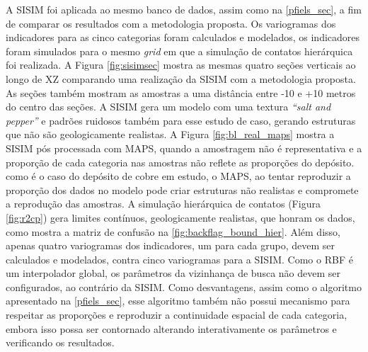 A SISIM foi aplicada ao mesmo banco de dados, assim como na \autoref{pfiels_sec}, a fim de comparar os resultados com a metodologia proposta. Os variogramas dos indicadores para as cinco categorias foram calculados e modelados, os indicadores foram simulados para o mesmo \textit{grid} em que a simulação de contatos hierárquica foi realizada. A Figura \autoref{fig:sisimsec} mostra as mesmas quatro seções verticais ao longo de XZ comparando uma realização da SISIM com a metodologia proposta. As seções também mostram as amostras a uma distância entre -10 e +10 metros do centro das seções. A SISIM gera um modelo com uma textura \textit{“salt and pepper”} e padrões ruidosos também para esse estudo de caso, gerando estruturas que não são geologicamente realistas. A Figura \autoref{fig:bl_real_maps} mostra a SISIM pós processada com MAPS, quando a amostragem não é representativa e a proporção de cada categoria nas amostras não reflete as proporções do depósito. como é o caso do depósito de cobre em estudo, o MAPS, ao tentar reproduzir a proporção dos dados no modelo pode criar estruturas não realistas e compromete a reprodução das amostras. A simulação hierárquica de contatos (Figura \autoref{fig:r2cp}) gera limites contínuos, geologicamente realistas, que honram os dados, como mostra a matriz de confusão na \autoref{fig:backflag_bound_hier}. Além disso, apenas quatro variogramas dos indicadores, um para cada grupo, devem ser calculados e modelados, contra cinco variogramas para a SISIM. Como o RBF é um interpolador global, os parâmetros da vizinhança de busca não devem ser configurados, ao contrário da SISIM. Como desvantagens, assim como o algoritmo apresentado na \autoref{pfiels_sec}, esse algoritmo também não possui mecanismo para respeitar as proporções e reproduzir a continuidade espacial de cada categoria, embora isso possa ser contornado alterando interativamente os parâmetros e verificando os resultados.

